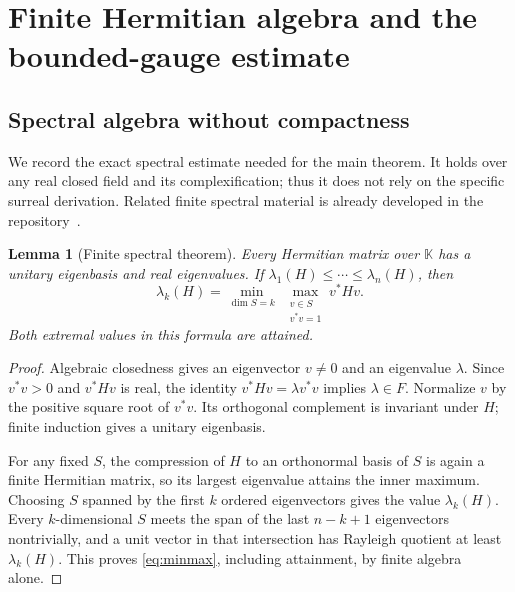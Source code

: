 \documentclass[11pt,a4paper]{article}
\numberwithin{equation}{section}
\newtheorem{lemma}[lemma]{Lemma}
\theoremstyle{definition}
\theoremstyle{remark}
\newcommand{\K}{\mathbb K}
\begin{document}
\section{Finite Hermitian algebra and the bounded-gauge estimate}\label{sec:hermitian}

\subsection{Spectral algebra without compactness}
We record the exact spectral estimate needed for the main theorem. It
holds over any real closed field and its complexification; thus it does
not rely on the specific surreal derivation. Related finite spectral
material is already developed in the repository~\cite{RepoSpectral}.

\begin{lemma}[Finite spectral theorem]\label{lem:spectral}
Every Hermitian matrix over $\K$ has a unitary eigenbasis and real
 eigenvalues. If $\lambda_1(H)\le\cdots\le\lambda_n(H)$, then
\begin{equation}\label{eq:minmax}
 \lambda_k(H)=\min_{\dim S=k}\ \max_{\substack{v\in S\\v^*v=1}}v^*Hv.
\end{equation}
Both extremal values in this formula are attained.
\end{lemma}
\begin{proof}
Algebraic closedness gives an eigenvector $v\ne0$ and an eigenvalue
$\lambda$. Since $v^*v>0$ and $v^*Hv$ is real, the identity
$v^*Hv=\lambda v^*v$ implies $\lambda\in F$. Normalize $v$ by the positive
square root of $v^*v$. Its orthogonal complement is invariant under $H$;
finite induction gives a unitary eigenbasis.

For any fixed $S$, the compression of $H$ to an orthonormal basis of $S$
is again a finite Hermitian matrix, so its largest eigenvalue attains the
inner maximum. Choosing $S$ spanned by the first $k$ ordered eigenvectors
gives the value $\lambda_k(H)$. Every $k$-dimensional $S$ meets the span
of the last $n-k+1$ eigenvectors nontrivially, and a unit vector in that
intersection has Rayleigh quotient at least $\lambda_k(H)$. This proves
\eqref{eq:minmax}, including attainment, by finite algebra alone.
\end{proof}
\end{document}
